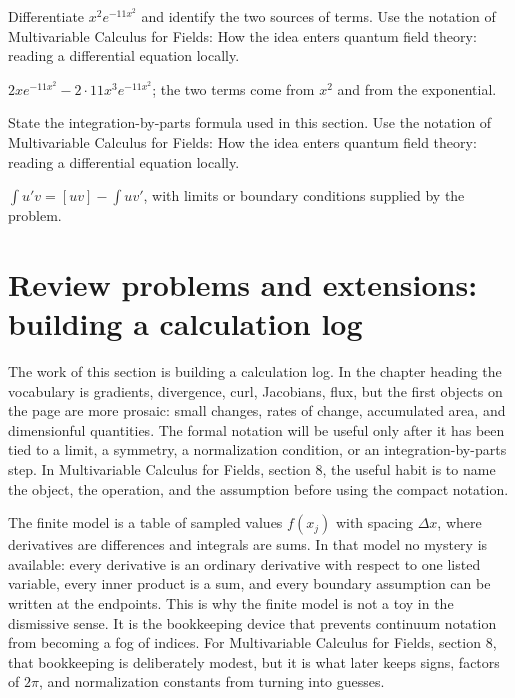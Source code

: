 \begin{exercise}
Differentiate \(x^2e^{-11x^2}\) and identify the two sources of terms.  Use the notation of Multivariable Calculus for Fields: How the idea enters quantum field theory: reading a differential equation locally.
\begin{answer}
\(2xe^{-11x^2}-2\cdot 11x^3e^{-11x^2}\); the two terms come from \(x^2\) and from the exponential.
\end{answer}
\end{exercise}

\begin{exercise}
State the integration-by-parts formula used in this section.  Use the notation of Multivariable Calculus for Fields: How the idea enters quantum field theory: reading a differential equation locally.
\begin{answer}
\(\int u'v=[uv]-\int uv'\), with limits or boundary conditions supplied by the problem.
\end{answer}
\end{exercise}



\section{Review problems and extensions: building a calculation log}

The work of this section is building a calculation log.  In the chapter heading the vocabulary is gradients, divergence, curl, Jacobians, flux, but the first objects on the page are more prosaic: small changes, rates of change, accumulated area, and dimensionful quantities.  The formal notation will be useful only after it has been tied to a limit, a symmetry, a normalization condition, or an integration-by-parts step.  In Multivariable Calculus for Fields, section 8, the useful habit is to name the object, the operation, and the assumption before using the compact notation.

The finite model is a table of sampled values \(f(x_j)\) with spacing \(\Delta x\), where derivatives are differences and integrals are sums.  In that model no mystery is available: every derivative is an ordinary derivative with respect to one listed variable, every inner product is a sum, and every boundary assumption can be written at the endpoints.  This is why the finite model is not a toy in the dismissive sense.  It is the bookkeeping device that prevents continuum notation from becoming a fog of indices.  For Multivariable Calculus for Fields, section 8, that bookkeeping is deliberately modest, but it is what later keeps signs, factors of \(2\pi\), and normalization constants from turning into guesses.

